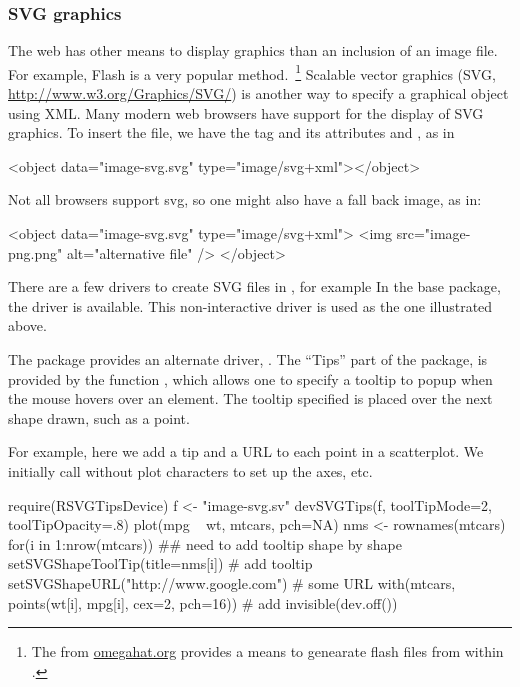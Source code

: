 \subsubsection{SVG graphics}
\label{sec:svg-graphics}
The web has other means to display graphics than an inclusion of an
image file. For example, Flash is a very popular method.~\footnote{The
   from \url{omegahat.org} provides a means to
  genearate flash files from within \R.} Scalable vector graphics
(SVG, \url{http://www.w3.org/Graphics/SVG/}) is another way to specify
a graphical object using XML. Many modern web browsers have support for
the display of SVG graphics. To insert the file, we have the
 tag and its attributes  and
, as in
\begin{HTMLinput}
<object data="image-svg.svg" type="image/svg+xml"></object> 
\end{HTMLinput}
Not all browsers support svg, so one might also have a fall back
image, as in:
\begin{HTMLinput}
<object data="image-svg.svg" type="image/svg+xml">
<img src="image-png.png" alt="alternative file" /> 
</object> 
\end{HTMLinput}

There are a few drivers to create SVG files in \R, for example In the base
 package, the driver  is available.  This non-interactive
driver is used as the  one illustrated above.


The  package provides an alternate driver,
.  The ``Tips'' part of the package, is provided
by the function , which allows one to
specify a tooltip to popup when the mouse hovers over an element. The
tooltip specified is placed over the next shape drawn, such as a
point.

For example, here we add a tip and a URL to each point in a
scatterplot. We initially call  without plot characters to
set up the axes, etc.
\begin{Schunk}
\begin{Sinput}
 require(RSVGTipsDevice)
 f <- "image-svg.sv"
 devSVGTips(f, toolTipMode=2, toolTipOpacity=.8) 
 plot(mpg ~ wt, mtcars, pch=NA) 
 nms <- rownames(mtcars) 
 for(i in 1:nrow(mtcars)) { 
   ## need to add tooltip shape by shape 
   setSVGShapeToolTip(title=nms[i])    # add tooltip 
   setSVGShapeURL("http://www.google.com")    # some URL 
   with(mtcars, points(wt[i], mpg[i], cex=2, pch=16)) # add
 } 
 invisible(dev.off())
\end{Sinput}
\end{Schunk}




